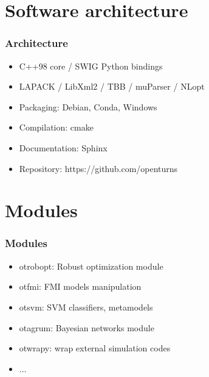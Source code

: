 \documentclass{beamer}
\begin{document}

\section{Software architecture}

\begin{frame}[containsverbatim]
\frametitle{Architecture}

\begin{itemize}
\item C++98 core / SWIG Python bindings
\item LAPACK / LibXml2 / TBB / muParser / NLopt
\item Packaging: Debian, Conda, Windows
\item Compilation: cmake
\item Documentation: Sphinx
\item Repository: https://github.com/openturns
\end{itemize}

\end{frame}


\section{Modules}

\begin{frame}[containsverbatim]
\frametitle{Modules}

\begin{itemize}
\item otrobopt: Robust optimization module

\item otfmi: FMI models manipulation

\item otsvm: SVM classifiers, metamodels

\item otagrum: Bayesian networks module

\item otwrapy: wrap external simulation codes

\item ...
\end{itemize}

\end{frame}

\end{document}
